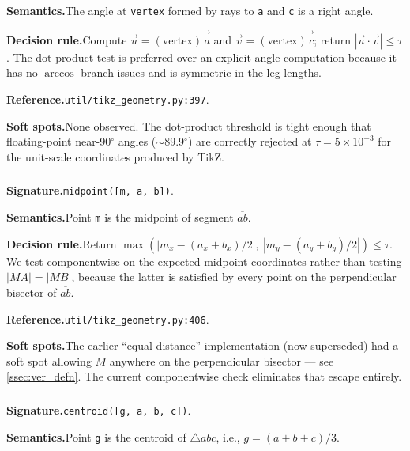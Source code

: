 \noindent\textbf{Semantics.}\quad The angle at \texttt{vertex} formed by rays to \texttt{a} and \texttt{c} is a right angle.

\noindent\textbf{Decision rule.}\quad Compute $\vec{u} = \vec{(\text{vertex})\,a}$ and $\vec{v} = \vec{(\text{vertex})\,c}$; return $|\vec{u}\cdot\vec{v}| \leq \tau$.
The dot-product test is preferred over an explicit angle computation because it has no $\arccos$ branch issues and is symmetric in the leg lengths.

\noindent\textbf{Reference.}\quad \texttt{util/tikz\_geometry.py:397}.

\noindent\textbf{Soft spots.}\quad None observed.
The dot-product threshold is tight enough that floating-point near-90$^\circ$ angles ($\sim$89.9$^\circ$) are correctly rejected at $\tau = 5\times 10^{-3}$ for the unit-scale coordinates produced by TikZ.

\subsubsection{}
\label{app:pred:midpoint}

\noindent\textbf{Signature.}\quad \texttt{midpoint([m, a, b])}.

\noindent\textbf{Semantics.}\quad Point \texttt{m} is the midpoint of segment $\overline{ab}$.

\noindent\textbf{Decision rule.}\quad Return $\max(|m_x - (a_x{+}b_x)/2|,\ |m_y - (a_y{+}b_y)/2|) \leq \tau$.
We test componentwise on the expected midpoint coordinates rather than testing $|MA|=|MB|$, because the latter is satisfied by every point on the perpendicular bisector of $\overline{ab}$.

\noindent\textbf{Reference.}\quad \texttt{util/tikz\_geometry.py:406}.

\noindent\textbf{Soft spots.}\quad The earlier ``equal-distance'' implementation (now superseded) had a soft spot allowing $M$ anywhere on the perpendicular bisector --- see \cref{ssec:ver_defn}.
The current componentwise check eliminates that escape entirely.

\subsubsection{}
\label{app:pred:centroid}

\noindent\textbf{Signature.}\quad \texttt{centroid([g, a, b, c])}.

\noindent\textbf{Semantics.}\quad Point \texttt{g} is the centroid of $\triangle abc$, i.e., $g = (a + b + c)/3$.


